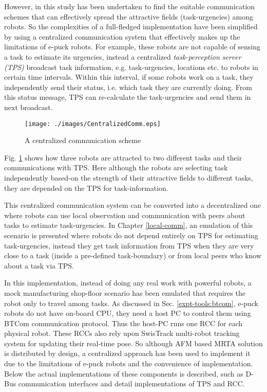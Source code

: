 However, in this study has been undertaken to find the suitable communication schemes that can effectively spread the attractive fields (task-urgencies) among robots. So the complexities of a full-fledged implementation have been simplified by using a centralized communication system  that effectively makes up the limitations of e-puck robots.  For example, these robots are not  capable of sensing a task to estimate its urgencies, instead a centralized {\em task-perception server (TPS)} broadcast task information, e.g. task-urgencies, locations etc. to robots in certain time intervals. Within this interval, if some robots work on a task, they independently send their status, i.e. which task they are currently doing. From this status message,  TPS can re-calculate the task-urgencies and send them in next broadcast. 
\begin{figure}[H]
\centering
\texttt{[image: ./images/CentralizedComm.eps]}
\caption{\small A centralized communication scheme} %
\label{fig:ccm} %
\end{figure}

Fig. \ref{fig:ccm} shows how three robots are attracted to two different tasks and their communications with TPS. Here although the robots are selecting task independently based-on the strength of their attractive fields to different tasks, they are depended on the TPS for task-information.

This centralized communication system can be converted into a decentralized one where robots can use local observation and communication with peers about tasks to estimate task-urgencies. In Chapter \ref{local-comm}, an emulation of this scenario is presented where robots do not depend entirely on TPS for estimating task-urgencies, instead they get task information from TPS when they are very close to a task (inside a pre-defined task-boundary) or from local peers who know about a task via TPS.

In this implementation, instead of doing any real work with powerful robots,  a mock manufacturing shop-floor scenario has been emulated that requires the robot only to travel among tasks. As discussed in Sec. \ref{expt-tools:btcom}, e-puck robots do not have on-board CPU, they need a host PC to  control them using BTCom communication protocol. Thus the host-PC  runs one RCC for each physical robot. These RCCs also rely upon SwisTrack multi-robot tracking system for updating their real-time pose. So although AFM based MRTA solution is distributed by design,  a centralized approach has been used to implement it due to the limitations of e-puck robots and the convenience of implementation. Below the actual implementations of these components is described, such as D-Bus communication interfaces and detail implementations of TPS and RCC.
